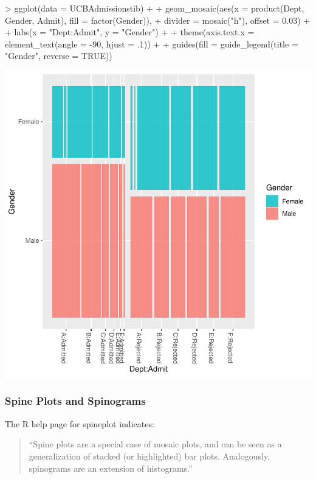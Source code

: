 \documentclass[12pt,letterpaper,final]{article}
\begin{document}
\begin{Schunk}
\begin{Sinput}
> ggplot(data = UCBAdmissionstib) +
+    geom_mosaic(aes(x = product(Dept, Gender, Admit), fill = factor(Gender)), 
+                divider = mosaic("h"), offset = 0.03) +
+   labs(x = "Dept:Admit", y = "Gender") +
+   theme(axis.text.x = element_text(angle = -90, hjust = .1)) +
+   guides(fill = guide_legend(title = "Gender", reverse = TRUE))
\end{Sinput}
\end{Schunk}
\includegraphics{lect_main-046}


\newpage




\newpage


\subsubsection{Spine Plots and Spinograms}


The R help page for spineplot indicates:
\begin{quotation}
``Spine plots are a special case of mosaic plots, 
and can be seen as a generalization of stacked (or highlighted) 
bar plots. Analogously, spinograms are an extension of histograms.''
\end{quotation}
\end{document}
